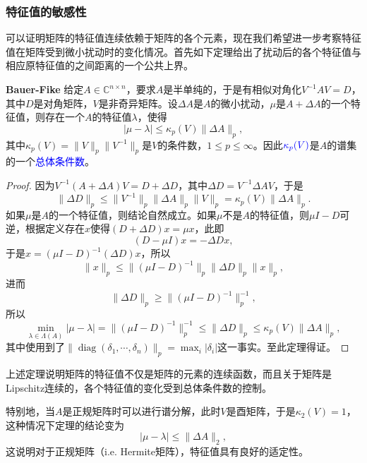 \documentclass[a4paper,10pt]{ctexart}
\begin{document}
\subsubsection{特征值的敏感性}
可以证明矩阵的特征值连续依赖于矩阵的各个元素，现在我们希望进一步考察特征值在矩阵受到微小扰动时的变化情况。首先如下定理给出了扰动后的各个特征值与相应原特征值的之间距离的一个公共上界。
\begin{theorem}{\normalfont\bf{Bauer-Fike}}
    给定$ A\in \mathbb{C}^{n\times n} $，要求$ A $是半单纯的，于是有相似对角化$ V^{-1}AV = D $，其中$ D $是对角矩阵，$ V $是非奇异矩阵。设$ \Delta A $是$ A $的微小扰动，$ \mu $是$ A + \Delta A $的一个特征值，则存在一个$ A $的特征值$ \lambda $，使得
    \begin{equation}
        \left\vert \mu-\lambda \right\vert \leqslant \kappa_p(V) \| \Delta A \|_p,
    \end{equation}
    其中$ \kappa_p(V) = \| V \|_p\| V^{-1} \|_p $是$ V $的条件数，$ 1\leqslant p\leqslant \infty $。因此$ \textcolor{blue}{\kappa_p(V)} $是$ A $的谱集的一个\textcolor{blue}{总体条件数}。
\end{theorem}
\begin{proof}
    因为$ V^{-1}(A+\Delta A)V = D + \Delta D $，其中$ \Delta D = V^{-1}\Delta A V $，于是
    \[
        \| \Delta D \|_p \leqslant  \| V^{-1} \|_p \| \Delta A \|_p \| V \|_p = \kappa_p(V) \| \Delta A \|_p.
    \]
    如果$ \mu $是$ A $的一个特征值，则结论自然成立。如果$ \mu $不是$ A $的特征值，则$ \mu I- D $可逆，根据定义存在$ x $使得$ (D+\Delta D)x = \mu x $，此即
    \[
        (D - \mu I )x = -\Delta D x,
    \]
    于是$ x = (\mu I - D)^{-1} (\Delta D) x $，所以
    \[
        \| x \|_p \leqslant \| (\mu I - D)^{-1} \|_p \| \Delta D\|_p \| x \|_p,  
    \]
    进而
    \[
        \| \Delta D \|_p \geqslant \| (\mu I - D)^{-1} \|_p^{-1},
    \]
    所以
    \[
        \min_{\lambda\in \Lambda(A)} \left\vert \mu - \lambda \right\vert =\| (\mu I - D)^{-1} \|_p^{-1}\leqslant \| \Delta D \|_p\leqslant  \kappa_p(V) \| \Delta A \|_p,
    \]
    其中使用到了$ \| \operatorname{diag}(\delta_1,\cdots ,\delta_n) \|_p = \max_{i} |\delta_i| $这一事实。至此定理得证。
\end{proof}
上述定理说明矩阵的特征值不仅是矩阵的元素的连续函数，而且关于矩阵是Lipschitz连续的，各个特征值的变化受到总体条件数的控制。

特别地，当$ A $是正规矩阵时可以进行谱分解，此时$ V $是酉矩阵，于是$ \kappa_2(V) = 1 $，这种情况下定理的结论变为
\begin{equation}
    \left\vert \mu-\lambda \right\vert \leqslant \| \Delta A \|_2,
\end{equation}
这说明对于正规矩阵（i.e. Hermite矩阵），特征值具有良好的适定性。
\end{document}
